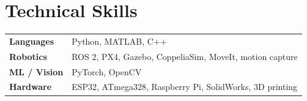 \documentclass[11pt,letterpaper]{article}
\begin{document}
\section{Technical Skills}
\begin{tabularx}{\textwidth}{@{}l X@{}}
  \textbf{Languages}   & Python, MATLAB, C++ \\
  \textbf{Robotics}    & ROS 2, PX4, Gazebo, CoppeliaSim, MoveIt, motion capture \\
  \textbf{ML / Vision} & PyTorch, OpenCV \\
  \textbf{Hardware}    & ESP32, ATmega328, Raspberry Pi, SolidWorks, 3D printing \\
\end{tabularx}
\end{document}
